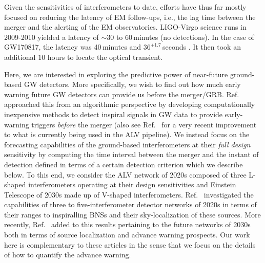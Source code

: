 \documentclass[prd,amsmath,amssymb,aps,floats,amsfonts,notitlepage,superscriptaddress,eqsecnum,nofootinbib,10pt]{revtex4-1}
\begin{document}
Given the sensitivities of interferometers to date, efforts have thus far mostly focused on reducing the latency of EM follow-ups, 
i.e., the lag time between the merger and the alerting of the EM observatories. 
LIGO-Virgo science runs in 2009-2010 yielded a latency of $\sim\!\! 30$ to $60\,$minutes \cite{Abbott:2011ys} (no detections).
In the case of GW170817, the latency was 40\,minutes and $36^{+1.7}\,$seconds \cite{GBM:2017lvd}.
It then took an additional $ 10$ hours to locate the optical transient. %

Here, we are interested  in exploring the predictive power of near-future ground-based GW detectors. 
More specifically, we wish to find out how much early warning future GW detectors can provide us before the merger/GRB.
Ref.~\cite{Cannon:2011vi} approached this from an algorithmic perspective by developing computationally inexpensive methods to detect inspiral
signals in GW data to provide early-warning triggers \emph{before} the merger (also see Ref.~\cite{Knowles:2018hqq} for a very recent improvement to what is currently being
used in the ALV pipeline).
We instead focus on the forecasting capabilities of the ground-based interferometers at their \emph{full design} sensitivity by computing the time interval
between the merger and the instant of detection defined in terms of a certain detection criterion which we describe below.
To this end, we consider the ALV network of 2020s composed of three L-shaped interferometers operating at their design sensitivities
and Einstein Telescope of 2030s made up of V-shaped interferometers.
Ref.~\cite{Nissanke:2012dj} investigated the capabilities of three to five-interferometer detector networks of 2020s in terms of their ranges
to inspiralling BNSs and their sky-localization of these sources. 
More recently, Ref.~\cite{Chan:2018csa} added to this results pertaining to the future networks of 2030s both in terms of source localization and advance
warning prospects.
Our work here is complementary to these articles in the sense that we focus on
the details of how to quantify the advance warning.
\end{document}
